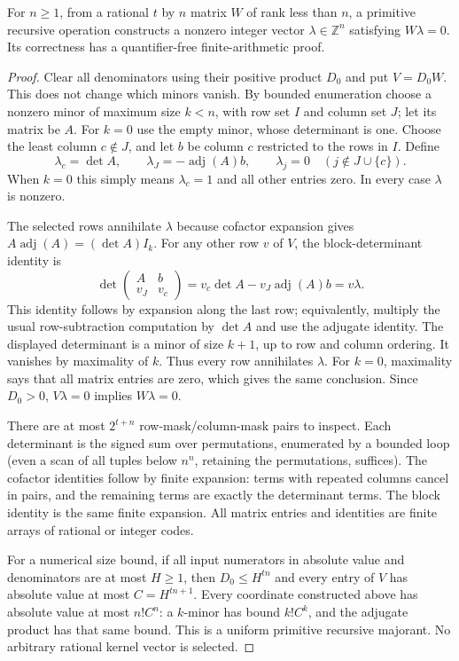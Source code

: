 \begin{lemma}
\label{lem:section-annihilator}
For $n\ge1$, from a rational $t$ by $n$ matrix $W$ of rank less than
$n$, a primitive recursive operation constructs a nonzero integer
vector $\lambda\in\mathbb Z^n$ satisfying $W\lambda=0$.
Its correctness has a quantifier-free finite-arithmetic proof.
\end{lemma}
\begin{proof}
Clear all denominators using their positive product $D_0$ and put
$V=D_0W$. This does not change which minors vanish. By bounded
enumeration choose a nonzero minor of maximum size $k<n$, with row
set $I$ and column set $J$; let its matrix be $A$. For $k=0$ use the
empty minor, whose determinant is one. Choose the least column
$c\notin J$, and let $b$ be column $c$ restricted to the rows in $I$.
Define
\[
 \lambda_c=\det A,\qquad
 \lambda_J=-\operatorname{adj}(A)b,\qquad
 \lambda_j=0\quad(j\notin J\cup\{c\}).
\]
When $k=0$ this simply means $\lambda_c=1$ and all other entries zero.
In every case $\lambda$ is nonzero.

The selected rows annihilate $\lambda$ because cofactor expansion gives
$A\operatorname{adj}(A)=(\det A)I_k$. For any other row $v$ of $V$,
the block-determinant identity is
\[
 \det\begin{pmatrix} A&b\\v_J&v_c\end{pmatrix}
       =v_c\det A-v_J\operatorname{adj}(A)b=v\lambda.
\]
This identity follows by expansion along the last row; equivalently,
multiply the usual row-subtraction computation by $\det A$ and use
the adjugate identity. The displayed determinant is a minor of size
$k+1$, up to row and column ordering. It vanishes by maximality of
$k$. Thus every row annihilates $\lambda$. For $k=0$, maximality says
that all matrix entries are zero, which gives the same conclusion.
Since $D_0>0$, $V\lambda=0$ implies $W\lambda=0$.

There are at most $2^{t+n}$ row-mask/column-mask pairs to inspect.
Each determinant is the signed sum over permutations, enumerated by
a bounded loop (even a scan of all tuples below $n^n$, retaining the
permutations, suffices). The cofactor identities follow by finite
expansion: terms with repeated columns cancel in pairs, and the
remaining terms are exactly the determinant terms. The block identity
is the same finite expansion. All matrix entries and identities are
finite arrays of rational or integer codes.

For a numerical size bound, if all input numerators in absolute value
and denominators are at most $H\ge1$, then
$D_0\le H^{tn}$ and every entry of $V$ has absolute value at most
$C=H^{tn+1}$. Every coordinate constructed above has absolute value
at most $n!C^n$: a $k$-minor has bound $k!C^k$, and the adjugate
product has that same bound. This is a uniform primitive recursive
majorant. No arbitrary rational kernel vector is selected.
\end{proof}

